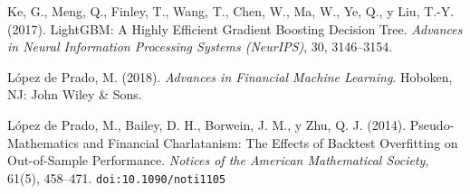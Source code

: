 \begin{list}{}{%
  \setlength{\leftmargin}{2em}%
  \setlength{\itemindent}{-2em}%
  \setlength{\itemsep}{0.6em}%
  \setlength{\parsep}{0pt}%
}
\item Ke, G., Meng, Q., Finley, T., Wang, T., Chen, W., Ma, W., Ye, Q., y Liu, T.-Y. (2017).
  LightGBM: A Highly Efficient Gradient Boosting Decision Tree.
  \textit{Advances in Neural Information Processing Systems (NeurIPS)}, 30, 3146--3154.

\item López de Prado, M. (2018). \textit{Advances in Financial Machine Learning}.
  Hoboken, NJ: John Wiley \& Sons.

\item López de Prado, M., Bailey, D. H., Borwein, J. M., y Zhu, Q. J. (2014). Pseudo-Mathematics and
  Financial Charlatanism: The Effects of Backtest Overfitting on Out-of-Sample Performance.
  \textit{Notices of the American Mathematical Society}, 61(5), 458--471.
  \texttt{doi:10.1090/noti1105}

\end{list}

